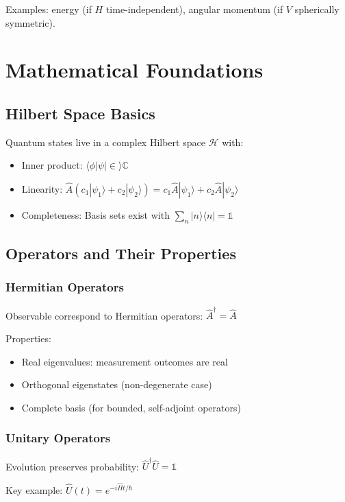 \documentclass[12pt,openany,oneside]{book}
\newcommand{\ket}[1]{|#1\rangle}
\newcommand{\bra}[1]{\langle #1|}
\newcommand{\braket}[2]{\langle #1|#2\rangle}
\begin{document}
{Examples: energy (if $H$ time-independent), angular momentum (if $V$ spherically symmetric).

\chapter{Mathematical Foundations}

\section{Hilbert Space Basics}

Quantum states live in a complex Hilbert space $\mathcal{H}$ with:
\begin{itemize}
  \item Inner product: $\braket{\phi|\psi} \in \mathbb{C}$
  \item Linearity: $\hat{A}(c_1\ket{\psi_1} + c_2\ket{\psi_2}) = c_1\hat{A}\ket{\psi_1} + c_2\hat{A}\ket{\psi_2}$
  \item Completeness: Basis sets exist with $\sum_n \ket{n}\bra{n} = \mathbb{1}$
\end{itemize}

\section{Operators and Their Properties}

\subsection{Hermitian Operators}

Observable correspond to Hermitian operators: $\hat{A}^\dagger = \hat{A}$

Properties:
\begin{itemize}
  \item Real eigenvalues: measurement outcomes are real
  \item Orthogonal eigenstates (non-degenerate case)
  \item Complete basis (for bounded, self-adjoint operators)
\end{itemize}

\subsection{Unitary Operators}

Evolution preserves probability: $\hat{U}^\dagger\hat{U} = \mathbb{1}$

Key example: $\hat{U}(t) = e^{-i\hat{H}t/\hbar}$

}
\end{document}
